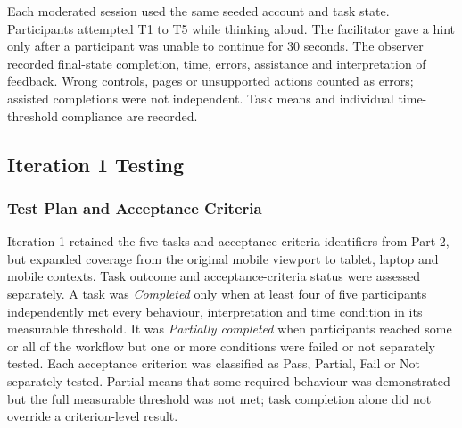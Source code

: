 \documentclass[11pt,a4paper]{article}
\begin{document}
Each moderated session used the same seeded account and task state.
Participants attempted T1 to T5 while thinking aloud. The facilitator gave a
hint only after a participant was unable to continue for 30 seconds. The
observer recorded final-state completion, time, errors, assistance and
interpretation of feedback. Wrong controls, pages or unsupported actions
counted as errors; assisted completions were not independent. Task means and individual time-threshold compliance are recorded.

\subsection{Iteration 1 Testing}
\label{subseciterationone}

\subsubsection{Test Plan and Acceptance Criteria}

Iteration 1 retained the five tasks and acceptance-criteria identifiers from
Part 2, but expanded coverage from the original mobile viewport to tablet,
laptop and mobile contexts. Task outcome and acceptance-criteria status were
assessed separately. A task was \textit{Completed} only when at least four of
five participants independently met every behaviour, interpretation and time
condition in its measurable threshold. It was \textit{Partially completed}
when participants reached some or all of the workflow but one or more
conditions were failed or not separately tested. Each acceptance criterion was
classified as Pass, Partial, Fail or Not separately tested. Partial means that
some required behaviour was demonstrated but the full measurable threshold was
not met; task completion alone did not override a criterion-level result.
\end{document}
